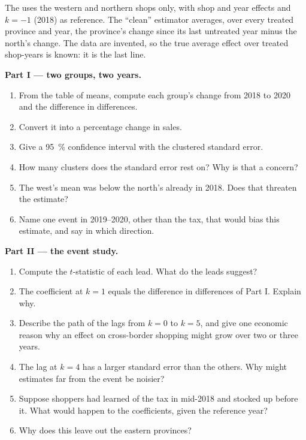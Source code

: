 \begin{problem}
\smallskip
\begin{center}\small
{}
\end{center}
The  uses the western and northern shops only, with shop and year
effects and $k = -1$ (2018) as reference. The ``clean'' estimator averages, over
every treated province and year, the province's change since its last untreated
year minus the north's change. The data are invented, so the true average effect
over treated shop-years is known: it is the last line.

\medskip\noindent\textbf{Part I --- two groups, two years.}
\begin{enumerate}
\item From the table of means, compute each group's change from 2018 to 2020
and the difference in differences.
\item Convert it into a percentage change in sales.
\item Give a 95~\% confidence interval with the clustered standard error.
\item How many clusters does the standard error rest on? Why is that a concern?
\item The west's mean was below the north's already in 2018. Does that threaten
the estimate?
\item Name one event in 2019--2020, other than the tax, that would bias this
estimate, and say in which direction.
\end{enumerate}

\medskip\noindent\textbf{Part II --- the event study.}
\begin{enumerate}[resume]
\item Compute the $t$-statistic of each lead. What do the leads suggest?
\item The coefficient at $k = 1$ equals the difference in differences of Part I.
Explain why.
\item Describe the path of the lags from $k = 0$ to $k = 5$, and give one
economic reason why an effect on cross-border shopping might grow over two or
three years.
\item The lag at $k = 4$ has a larger standard error than the others. Why might
estimates far from the event be noisier?
\item Suppose shoppers had learned of the tax in mid-2018 and stocked up before
it. What would happen to the coefficients, given the reference year?
\item Why does this  leave out the eastern provinces?
\end{enumerate}


\end{problem}
